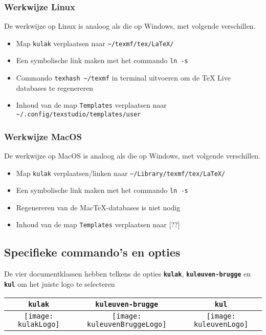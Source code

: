 \documentclass[kulak]{kulakarticle} %
\begin{document}
\subsubsection{Werkwijze Linux}
\label{sssec:linux}

De werkwijze op Linux is analoog als die op Windows, met volgende verschillen.

\begin{itemize}
\item Map \texttt{kulak} verplaatsen naar \verb+~/texmf/tex/LaTeX/+
\item Een symbolische link maken met het commando \texttt{ln -s}
\item Commando \verb+texhash ~/texmf+ in terminal uitvoeren om de TeX Live databases te regenereren
\item Inhoud van de map \texttt{Templates} verplaatsen naar \verb+~/.config/texstudio/templates/user+
\end{itemize}

\subsubsection{Werkwijze MacOS}
\label{sssec:macos}

De werkwijze op MacOS is analoog als die op Windows, met volgende verschillen.
\begin{itemize}
	\item  Map \texttt{kulak} verplaatsen/linken naar \verb+~/Library/texmf/tex/LaTeX/+
\item Een symbolische link maken met het commando \texttt{ln -s}
\item Regenereren van de MacTeX-databases is niet nodig
\item Inhoud van de map \texttt{Templates} verplaatsen naar [??]
\end{itemize}
				
\subsection{Specifieke commando's en opties}
De vier documentklassen hebben telkens de opties \textbf{\texttt{kulak}}, \textbf{\texttt{kuleuven-brugge}} en \textbf{\texttt{kul}} om het juiste logo te selecteren
\begin{center}
	\begin{tabular}{c|c|c}
		\textbf{\texttt{kulak}} & \textbf{\texttt{kuleuven-brugge}} & \textbf{\texttt{kul}}\\ \hline
		\texttt{[image: kulakLogo]} & \texttt{[image: kuleuvenBruggeLogo]} & \texttt{[image: kuleuvenLogo]}
	\end{tabular}
\end{center}
\end{document}
